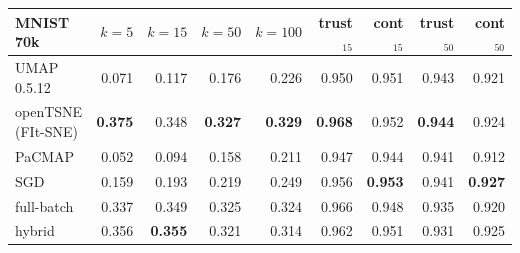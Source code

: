 \begin{tabular}{lrrrrrrrr}
\toprule
MNIST 70k & $k=5$ & $k=15$ & $k=50$ & $k=100$ & trust$_{15}$ & cont$_{15}$ & trust$_{50}$ & cont$_{50}$ \\
\midrule
UMAP 0.5.12 & 0.071 & 0.117 & 0.176 & 0.226 & 0.950 & 0.951 & 0.943 & 0.921 \\
openTSNE (FIt-SNE) & \textbf{0.375} & 0.348 & \textbf{0.327} & \textbf{0.329} & \textbf{0.968} & 0.952 & \textbf{0.944} & 0.924 \\
PaCMAP & 0.052 & 0.094 & 0.158 & 0.211 & 0.947 & 0.944 & 0.941 & 0.912 \\
\magnet{} SGD & 0.159 & 0.193 & 0.219 & 0.249 & 0.956 & \textbf{0.953} & 0.941 & \textbf{0.927} \\
\magnet{} full-batch & 0.337 & 0.349 & 0.325 & 0.324 & 0.966 & 0.948 & 0.935 & 0.920 \\
\magnet{} hybrid & 0.356 & \textbf{0.355} & 0.321 & 0.314 & 0.962 & 0.951 & 0.931 & 0.925 \\
\bottomrule
\end{tabular}
